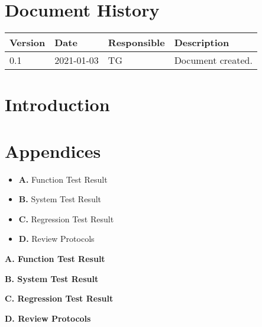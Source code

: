 \documentclass{article}
\date {#1}
\title {
    \documentNumber {06}    
    
    \documentVersion {0.1}
    
    \documentTitle {Software Verification and Validation Report}
    \documentGroup {2}
    
    \documentResponsible {Test Group}
    \documentAuthors {Test Group}
    
    \documentDate {2021-03-03}
}
\begin{document}
\maketitle
\thispagestyle{empty}

\newpage

\tableofcontents

\newpage


\section{Document History}
\begin{tabular}{ l | l | l | l }
    Version & Date & Responsible & Description \\
    \hline
  	0.1 & 2021-01-03 & TG & Document created. \\
\end{tabular}

\section{Introduction}

\section{Appendices}
\begin{itemize}
\item \textbf{A.} Function Test Result
\item \textbf{B.} System Test Result
\item \textbf{C.} Regression Test Result 
\item \textbf{D.} Review Protocols
\end{itemize}

\newpage
\begin{flushleft}
{\large \textbf{A. Function Test Result}}
\end{flushleft}

\newpage
\begin{flushleft}
{\large \textbf{B. System Test Result}}
\end{flushleft}


\newpage
\begin{flushleft}
{\large \textbf{C. Regression Test Result}}
\end{flushleft}


\newpage
\begin{flushleft}
{\large \textbf{D. Review Protocols}}
\end{flushleft}


\end{document}
